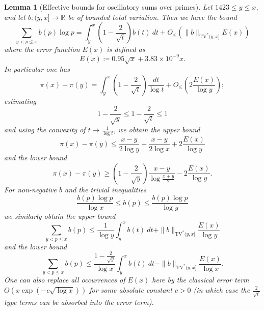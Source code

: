 \documentclass[12pt,a4paper,reqno]{amsart}
\numberwithin{equation}{section}
\theoremstyle{plain}
\newtheorem{lemma}[theorem]{Lemma}
\theoremstyle{definition}
\newcommand\R{\mathbb{R}}
\begin{document}
\begin{lemma}[Effective bounds for oscillatory sums over primes]\label{osc-lemma}  Let $1423 \leq y \leq x$, and let $b: (y,x] \to \R$ be of bounded total variation.  Then we have the bound
\begin{equation}\label{bv-exact}
    \sum_{y < p \leq x} b(p) \log p = \int_y^x \left(1-\frac{2}{\sqrt{t}}\right) b(t)\ dt + O_{\leq}(\|b\|_{\mathrm{TV}^*(y,x]} E(x))
\end{equation}
where the error function $E(x)$ is defined as
\begin{equation}\label{tilde-e}
  E(x) \coloneqq 0.95 \sqrt{x} + 3.83 \times 10^{-9} x.
\end{equation}
In particular one has
\begin{equation}\label{pix}
  \pi(x) - \pi(y) = \int_y^x \left(1-\frac{2}{\sqrt{t}}\right)\frac{dt}{\log t} + O_\leq\left(2 \frac{E(x)}{\log y}\right);
\end{equation}
estimating
$$ 1-\frac{2}{\sqrt{y}} \leq 1-\frac{2}{\sqrt{t}} \leq 1$$
and using the convexity of $t \mapsto \frac{1}{\log t}$, we obtain the upper bound
\begin{equation}\label{pixy-upper}
 \pi(x) - \pi(y) \leq \frac{x-y}{2\log y} + \frac{x-y}{2\log x} + 2 \frac{E(x)}{\log y}
\end{equation}
and the lower bound
\begin{equation}\label{pixy-lower}
  \pi(x) - \pi(y) \geq \left(1-\frac{2}{\sqrt{y}}\right) \frac{x-y}{\log \frac{x+y}{2}} - 2 \frac{E(x)}{\log y}.
\end{equation}
For non-negative $b$ and the trivial inequalities
$$ \frac{b(p) \log p}{\log x}  \leq b(p) \leq \frac{b(p) \log p}{\log y} $$
we similarly obtain the upper bound
\begin{equation}\label{bv-upper}
   \sum_{y < p \leq x} b(p) \leq \frac{1}{\log y} \int_y^x b(t)\ dt + \|b\|_{\mathrm{TV}^*(y,x]} \frac{E(x)}{\log y}
\end{equation}
and the lower bound
\begin{equation}\label{bv-lower}
  \sum_{y < p \leq x} b(p) \leq \frac{1-\frac{2}{\sqrt{y}}}{\log x} \int_y^x b(t)\ dt - \|b\|_{\mathrm{TV}^*(y,x]} \frac{E(x)}{\log x}.
\end{equation}
One can also replace all occurrences of $E(x)$ here by the classical error term $O(x \exp(-c \sqrt{\log x}))$ for some absolute constant $c>0$ (in which case the $\frac{2}{\sqrt{t}}$ type terms can be absorbed into the error term).
\end{lemma}
\end{document}
